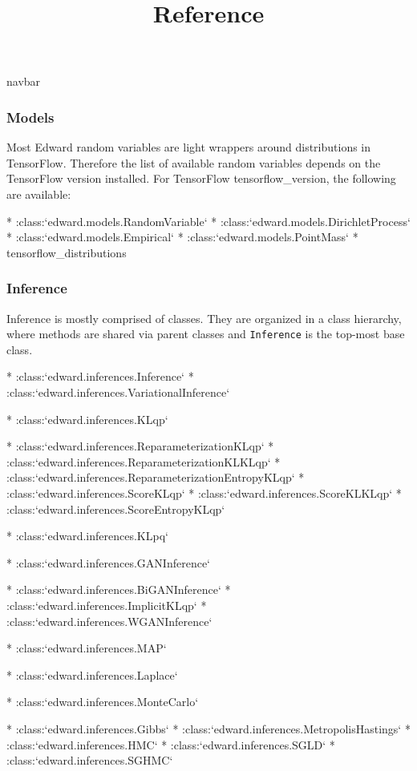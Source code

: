 \title{Reference}

{{navbar}}

\subsubsection{Models}

Most Edward random variables are light wrappers around distributions
in TensorFlow. Therefore the list of available random variables
depends on the TensorFlow version installed. For TensorFlow
{{tensorflow_version}}, the following are available:

{%

* :class:`edward.models.RandomVariable`
* :class:`edward.models.DirichletProcess`
* :class:`edward.models.Empirical`
* :class:`edward.models.PointMass`
* {{tensorflow_distributions}}


\subsubsection{Inference}

Inference is mostly comprised of classes. They are organized in a
class hierarchy, where methods are shared via parent classes and
\texttt{Inference} is the top-most base class.

{%

* :class:`edward.inferences.Inference`
* :class:`edward.inferences.VariationalInference`

  * :class:`edward.inferences.KLqp`

    * :class:`edward.inferences.ReparameterizationKLqp`
    * :class:`edward.inferences.ReparameterizationKLKLqp`
    * :class:`edward.inferences.ReparameterizationEntropyKLqp`
    * :class:`edward.inferences.ScoreKLqp`
    * :class:`edward.inferences.ScoreKLKLqp`
    * :class:`edward.inferences.ScoreEntropyKLqp`

  * :class:`edward.inferences.KLpq`

  * :class:`edward.inferences.GANInference`

    * :class:`edward.inferences.BiGANInference`
    * :class:`edward.inferences.ImplicitKLqp`
    * :class:`edward.inferences.WGANInference`

  * :class:`edward.inferences.MAP`

    * :class:`edward.inferences.Laplace`

* :class:`edward.inferences.MonteCarlo`

  * :class:`edward.inferences.Gibbs`
  * :class:`edward.inferences.MetropolisHastings`
  * :class:`edward.inferences.HMC`
  * :class:`edward.inferences.SGLD`
  * :class:`edward.inferences.SGHMC`

}}
